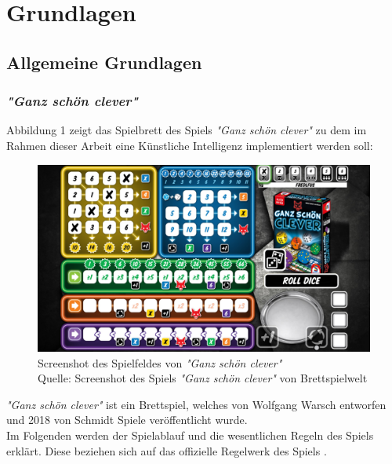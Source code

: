 \section{Grundlagen}
\subsection{Allgemeine Grundlagen}
\subsubsection{\textit{"Ganz schön clever"}}
	Abbildung 1 zeigt das Spielbrett des Spiels \textit{"Ganz schön clever"} zu dem im Rahmen dieser Arbeit eine Künstliche Intelligenz implementiert werden soll:
	\nopagebreak
\begin{figure}[H]
	\includegraphics[width=1\textwidth]{Bilder/gsc} 
	\caption[Screenshot des Spielfeldes von \textit{"Ganz schön clever"}]{Screenshot des Spielfeldes von \textit{"Ganz schön clever"}\\ Quelle: Screenshot des Spiels \textit{"Ganz schön clever"} von Brettspielwelt}
\end{figure}

\textit{"Ganz schön clever"} ist ein Brettspiel, welches von Wolfgang Warsch entworfen und 2018 von Schmidt Spiele veröffentlicht wurde.\\

Im Folgenden werden der Spielablauf und die wesentlichen Regeln des Spiels erklärt. Diese beziehen sich auf das offizielle Regelwerk des Spiels \cite{schmidtspiele_ganzschonclever}.

